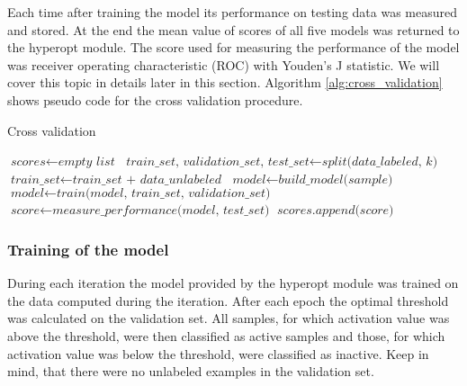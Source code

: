 \documentclass[a4paper,10pt]{report}
\begin{document}
	Each time after training the model its performance on testing data was measured and stored. At the end the mean value of scores of all five models was returned to the hyperopt module. The score used for measuring the performance of the model was receiver operating characteristic (ROC) with Youden's J statistic. We will cover this topic in details later in this section. Algorithm \ref{alg:cross_validation} shows pseudo code for the cross validation procedure.\\
	
	\begin{algorithm}
	\caption{Cross validation}\label{alg:cross_validation}
	\begin{algorithmic}[1]
	\State
	\State $\textit{scores} \gets \textit{empty list}$
	\State
	  \State $\textit{train\_set, validation\_set, test\_set} \gets \textit{split(data\_labeled, k)} $
	  \State $\textit{train\_set} \gets \textit{train\_set + data\_unlabeled}$
	  \State $\textit{model} \gets \textit{build\_model(sample)}$
	  \State $\textit{model} \gets \textit{train(model, train\_set, validation\_set)}$
	  \State $\textit{score} \gets \textit{measure\_performance(model, test\_set)}$
	  \State $\textit{scores.append(score)}$
	\EndFor
	\State       
	\State
	\EndProcedure
	\end{algorithmic}
	\end{algorithm}
	
	\subsubsection{Training of the model} %
	During each iteration the model provided by the hyperopt module was trained on the data computed during the iteration. After each epoch the optimal threshold was calculated on the validation set. All samples, for which activation value was above the threshold, were then classified as active samples and those, for which activation value was below the threshold, were classified as inactive. Keep in mind, that there were no unlabeled examples in the validation set.\\
	
\end{document}
